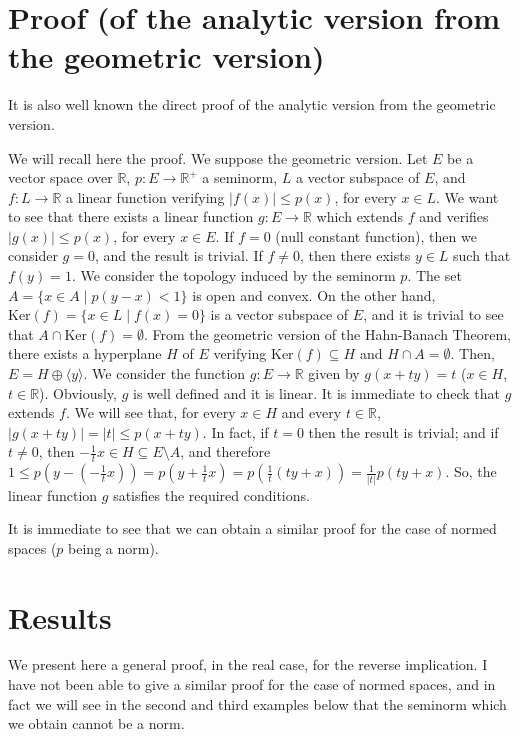 \documentclass{article}
\begin{document}
\section{Proof (of the analytic version from the geometric version)}

It is also well known the direct proof of the analytic version from the geometric version.

We will recall here the proof. We suppose the geometric version. Let $E$ be a vector space over $\mathbb{R}$, $p:E\rightarrow\mathbb{R}^{+}$ a seminorm, $L$ a vector subspace of $E$, and $f:L\rightarrow\mathbb{R}$ a linear function verifying $\vert f(x)\vert\leq p(x)$, for every $x\in L$. We want to see that there exists a linear function $g:E\rightarrow\mathbb{R}$ which extends $f$ and verifies $\vert g(x)\vert\leq p(x)$, for every $x\in E$. If $f=0$ (null constant function), then we consider $g=0$, and the result is trivial. If $f\neq0$, then there exists $y\in L$ such that $f(y)=1$. We consider the topology induced by the seminorm $p$. The set $A=\{x\in A \mid p(y-x)<1\}$ is open and convex. On the other hand, $\text{Ker}(f)=\{x\in L\mid f(x)=0\}$ is a vector subspace of $E$, and it is trivial to see that $A\cap\text{Ker}(f)=\emptyset$. From the geometric version of the Hahn-Banach Theorem, there exists a hyperplane $H$ of $E$ verifying $\text{Ker}(f)\subseteq H$ and $H\cap A=\emptyset$. Then, $E=H\oplus\langle y\rangle$. We consider the function $g:E\rightarrow\mathbb{R}$ given by $g(x+ty)=t$ ($x\in H$, $t\in\mathbb{R}$). Obviously, $g$ is well defined and it is linear. It is immediate to check that $g$ extends $f$. We will see that, for every $x\in H$ and every $t\in\mathbb{R}$, $\vert g(x+ty)\vert=\vert t\vert\leq p(x+ty)$. In fact, if $t=0$ then the result is trivial; and if $t\neq0$, then $-\frac{1}{t}x\in H\subseteq E\setminus A$, and therefore $1\leq p(y-(-\frac{1}{t}x))=p(y+\frac{1}{t}x)=p(\frac{1}{t}(ty+x))=\frac{1}{\vert t\vert}p(ty+x)$. So, the linear function $g$ satisfies the required conditions.

It is immediate to see that we can obtain a similar proof for the case of normed spaces ($p$ being a norm).

\section{Results}

We present here a general proof, in the real case, for the reverse
implication. I have not been able to give a similar proof for the case of
normed spaces, and in fact we will see in the second and third examples below that the
seminorm which we obtain cannot be a norm.
\end{document}
